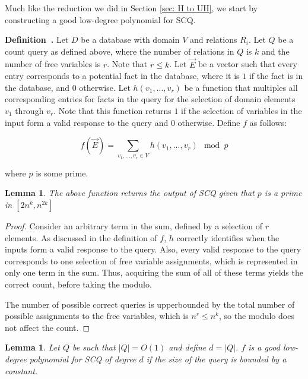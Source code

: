 \documentclass[11pt,letterpaper,pdftex]{article}
\newtheorem{lemma}[theorem]{Lemma}
\newcounter{definition}
\newenvironment{definition}[1][]{\refstepcounter{definition}\par\medskip
   \noindent \textbf{Definition~\thedefinition. #1} \rmfamily}{\medskip}
\begin{document}
Much like the reduction we did in Section \ref{sec: H to UH}, we start by constructing a good low-degree polynomial for SCQ.

\begin{definition}
Let $D$ be a database with domain $V$ and relations $R_i$. Let $Q$ be a count query as defined above, where the number of relations in $Q$ is $k$ and the number of free variables is $r$. Note that $r\leq k$. Let $\Vec E$ be a vector such that every entry corresponds to a potential fact in the database, where it is $1$ if the fact is in the database, and $0$ otherwise. Let $h(v_1,...,v_r)$ be a function that multiples all corresponding entries for facts in the query for the selection of domain elements $v_1$ through $v_r$. Note that this function returns $1$ if the selection of variables in the input form a valid response to the query and $0$ otherwise. Define $f$ as follows:

\[
f(\Vec E) = \sum_{v_1,...,v_r\in V} h(v_1,...,v_r)\mod{p}
\]

where $p$ is some prime.
\end{definition}



\begin{lemma}\label{lem: SCQ polynomial accuracy}
The above function returns the output of SCQ given that $p$ is a prime in $[2n^k, n^{2k}] $
\end{lemma}






\begin{proof}
Consider an arbitrary term in the sum, defined by a selection of $r$ elements. As discussed in the definition of $f$, $h$ correctly identifies when the inputs form a valid response to the query. Also, every valid response to the query corresponds to one selection of free variable assignments, which is represented in only one term in the sum. Thus, acquiring the sum of all of these terms yields the correct count, before taking the modulo.

The number of possible correct queries is upperbounded by the total number of possible assignments to the free variables, which is $n^r\leq n^k$, so the modulo does not affect the count.
\end{proof}

\begin{lemma}
Let $ Q $ be such that $|Q|= O(1) $ and define $d = |Q|$.
$f$ is a good low-degree polynomial for SCQ of degree $d$ if the size of the query is bounded by a constant. \label{lem:scqGLDP}
\end{lemma}
\end{document}
